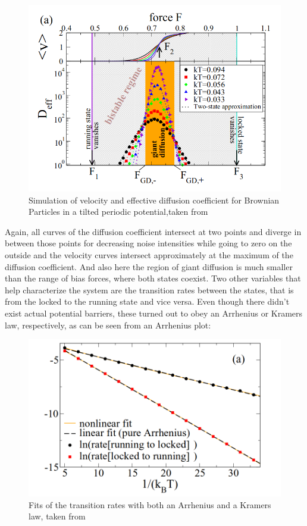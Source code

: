 \documentclass[12pt,a4paper]{article}
\begin{document}
\begin{figure}[H]
	\centering
	\includegraphics[scale=0.5]{nbpsim1.png}\caption{Simulation of velocity and effective diffusion coefficient for Brownian Particles in a tilted periodic potential,taken from \cite{bpp}}
	\label{anbpsim}
\end{figure}
Again, all curves of the diffusion coefficient intersect at two points and diverge in between those points for decreasing noise intensities while going to zero on the outside and the velocity curves intersect approximately at the maximum of the diffusion coefficient. And also here the region of giant diffusion is much smaller than the range of bias forces, where both states coexist. Two other variables that help characterize the system are the transition rates between the states, that is from the locked to the running state and vice versa. Even though there didn't exist actual potential barriers, these turned out to obey an Arrhenius or Kramers law, respectively, as can be seen from an Arrhenius plot:
\begin{figure}[H]
	\centering
	\includegraphics[scale=0.5]{kramerfit.png}\caption{Fits of the transition rates with both an Arrhenius and a Kramers law, taken from \cite{bpp}}
	\label{bparr}
\end{figure}
\end{document}
